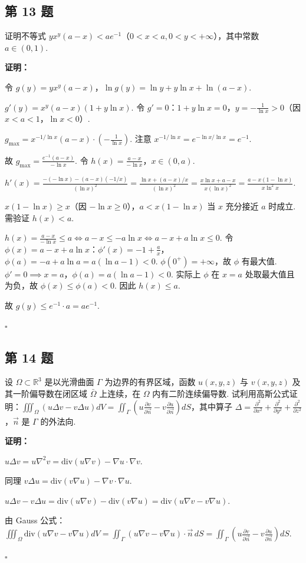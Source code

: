\documentclass[12pt,a4paper]{article}
\newenvironment{sol}[1][解]{%
  \par\medskip\noindent\textbf{#1：}\itshape\par\noindent\ignorespaces
}{%
  \par\hfill$\square$\par\medskip
}
\begin{document}
\subsection*{第 13 题}
证明不等式 $yx^y(a-x)<ae^{-1}$（$0<x<a, 0<y<+\infty$），其中常数 $a\in(0,1)$.

\begin{sol}[证明]令 $g(y)=yx^y(a-x)$，$\ln g(y)=\ln y+y\ln x+\ln(a-x)$.

  $g'(y)=x^y(a-x)(1+y\ln x)$. 令 $g'=0$：$1+y\ln x=0$，$y=-\frac{1}{\ln
  x}>0$（因 $x<a<1$，$\ln x<0$）.

  $g_{\max}=x^{-1/\ln x}(a-x)\cdot(-\frac{1}{\ln x})$. 注意 $x^{-1/\ln
  x}=e^{-\ln x/\ln x}=e^{-1}$.

  故 $g_{\max}=\frac{e^{-1}(a-x)}{-\ln x}$. 令 $h(x)=\frac{a-x}{-\ln
  x}$，$x\in(0,a)$.

  $h'(x)=\frac{-(-\ln x)-(a-x)(-1/x)}{(\ln x)^2}=\frac{\ln
  x+(a-x)/x}{(\ln x)^2}=\frac{x\ln x+a-x}{x(\ln x)^2}=\frac{a-x(1-\ln
  x)}{x\ln^2 x}$.

  $x(1-\ln x)\ge x$（因 $-\ln x\ge 0$），$a<x(1-\ln x)$ 当 $x$ 充分接近 $a$ 时成立.
  需验证 $h(x)<a$.

  $h(x)=\frac{a-x}{-\ln x}\le a\iff a-x\le -a\ln x\iff a-x+a\ln x\le
  0$. 令 $\phi(x)=a-x+a\ln x$：$\phi'(x)=-1+\frac{a}{x}$，$\phi(a)=-a+a\ln
  a=a(\ln a-1)<0$. $\phi(0^+)=+\infty$，故 $\phi$ 有最大值. $\phi'=0\implies
  x=a$，$\phi(a)=a(\ln a-1)<0$. 实际上 $\phi$ 在 $x=a$ 处取最大值且为负，故
  $\phi(x)\le\phi(a)<0$. 因此 $h(x)\le a$.

  故 $g(y)\le e^{-1}\cdot a=ae^{-1}$.
\end{sol}
\subsection*{第 14 题}
设 $\Omega\subset\mathbb{R}^3$ 是以光滑曲面 $\Gamma$ 为边界的有界区域，函数 $u(x,y,z)$
与 $v(x,y,z)$ 及其一阶偏导数在闭区域 $\bar{\Omega}$ 上连续，在 $\Omega$ 内有二阶连续偏导数.
试利用高斯公式证明：$\iiint_{\Omega}(u\Delta v-v\Delta
u)dV=\iint_{\Gamma}\left(u\frac{\partial v}{\partial
\vec{n}}-v\frac{\partial u}{\partial \vec{n}}\right)dS$，其中算子
$\Delta=\frac{\partial^2}{\partial x^2}+\frac{\partial^2}{\partial
y^2}+\frac{\partial^2}{\partial z^2}$，$\vec{n}$ 是 $\Gamma$ 的外法向.

\begin{sol}[证明]$u\Delta v=u\nabla^2 v=\text{div}(u\nabla
  v)-\nabla u\cdot\nabla v$.

  同理 $v\Delta u=\text{div}(v\nabla u)-\nabla v\cdot\nabla u$.

  $u\Delta v-v\Delta u=\text{div}(u\nabla v)-\text{div}(v\nabla
  u)=\text{div}(u\nabla v-v\nabla u)$.

  由 Gauss 公式：$\iiint_{\Omega}\text{div}(u\nabla v-v\nabla
  u)dV=\iint_{\Gamma}(u\nabla v-v\nabla
  u)\cdot\vec{n}\,dS=\iint_{\Gamma}\left(u\frac{\partial
  v}{\partial\vec{n}}-v\frac{\partial u}{\partial\vec{n}}\right)dS.$
\end{sol}
\end{document}
